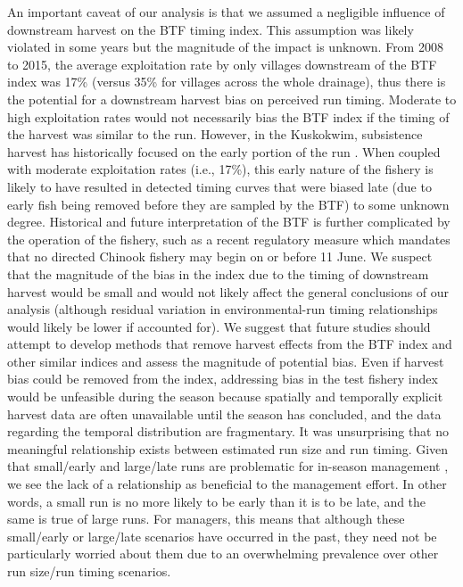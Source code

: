\documentclass[12pt,]{book}
\theoremstyle{definition}
\theoremstyle{definition}
\theoremstyle{definition}
\theoremstyle{remark}
\begin{document}
An important caveat of our analysis is that we assumed a negligible
influence of downstream harvest on the BTF timing index. This assumption
was likely violated in some years but the magnitude of the impact is
unknown. From 2008 to 2015, the average exploitation rate by only
villages downstream of the BTF index was 17\% (versus 35\% for villages
across the whole drainage), thus there is the potential for a downstream
harvest bias on perceived run timing. Moderate to high exploitation
rates would not necessarily bias the BTF index if the timing of the
harvest was similar to the run. However, in the Kuskokwim, subsistence
harvest has historically focused on the early portion of the run
\citep{hamazaki-2008}. When coupled with moderate exploitation rates
(i.e., 17\%), this early nature of the fishery is likely to have
resulted in detected timing curves that were biased late (due to early
fish being removed before they are sampled by the BTF) to some unknown
degree. Historical and future interpretation of the BTF is further
complicated by the operation of the fishery, such as a recent regulatory
measure which mandates that no directed Chinook fishery may begin on or
before 11 June. We suspect that the magnitude of the bias in the index
due to the timing of downstream harvest would be small and would not
likely affect the general conclusions of our analysis (although residual
variation in environmental-run timing relationships would likely be
lower if accounted for). We suggest that future studies should attempt
to develop methods that remove harvest effects from the BTF index and
other similar indices and assess the magnitude of potential bias. Even
if harvest bias could be removed from the index, addressing bias in the
test fishery index would be unfeasible during the season because
spatially and temporally explicit harvest data are often unavailable
until the season has concluded, and the data regarding the temporal
distribution are fragmentary. It was unsurprising that no meaningful
relationship exists between estimated run size and run timing. Given
that small/early and large/late runs are problematic for in-season
management \citep{adkison-cunningham-2015}, we see the lack of a
relationship as beneficial to the management effort. In other words, a
small run is no more likely to be early than it is to be late, and the
same is true of large runs. For managers, this means that although these
small/early or large/late scenarios have occurred in the past, they need
not be particularly worried about them due to an overwhelming prevalence
over other run size/run timing scenarios.
\end{document}
